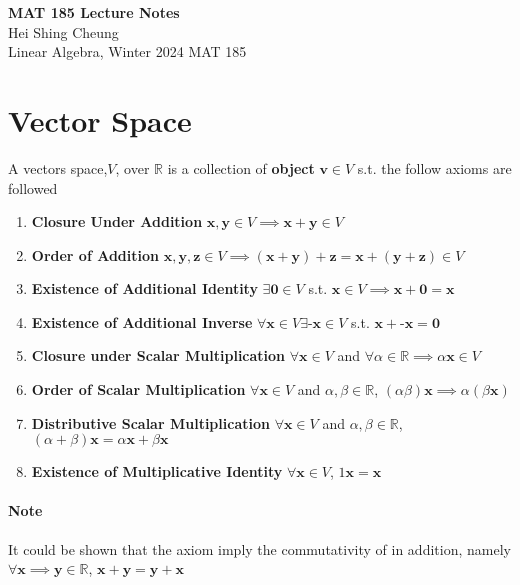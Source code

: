 \documentclass[11pt]{article}
\begin{document}
\thispagestyle{empty}
{\LARGE \bf MAT 185 Lecture Notes}\\
{\large Hei Shing Cheung}\\
Linear Algebra, Winter 2024 \hfill MAT 185\\
\section{Vector Space}
\begin{definition}
    A vectors space,${V}$, over $\mathbb{R}$ is a collection of \textbf{object} $\textbf{v} \in V$ s.t. the follow axioms are followed
    \begin{enumerate}
        \item \textbf{Closure Under Addition} $\textbf{x},\textbf{y} \in V \implies \textbf{x} + \textbf{y} \in V$
        \item \textbf{Order of Addition} $\textbf{x},\textbf{y}, \textbf{z} \in V \implies (\textbf{x} + \textbf{y}) + \textbf{z} = \textbf{x} + (\textbf{y} + \textbf{z}) \in V$
        \item \textbf{Existence of Additional Identity} $\exists \textbf{0} \in V$ s.t. $\textbf{x} \in V \implies \textbf{x} + \textbf{0} = \textbf{x}$
        \item \textbf{Existence of Additional Inverse} $\forall \textbf{x} \in V \exists \textbf{-x} \in V$ s.t. $\textbf{x} + \textbf{-x} = \textbf{0}$
        \item \textbf{Closure under Scalar Multiplication} $\forall \textbf{x} \in V$ and $\forall \alpha \in \mathbb{R} \implies \alpha\textbf{x} \in V$
        \item \textbf{Order of Scalar Multiplication} $\forall \textbf{x} \in V$ and $\alpha, \beta \in \mathbb{R}$, $(\alpha\beta)\textbf{x} \implies \alpha(\beta\textbf{x})$
        \item \textbf{Distributive Scalar Multiplication} $\forall \textbf{x} \in V$ and $\alpha, \beta \in \mathbb{R}$, $(\alpha + \beta)\textbf{x} = \alpha\textbf{x} + \beta\textbf{x}$
        \item \textbf{Existence of Multiplicative Identity} $\forall \textbf{x} \in V$, $1\textbf{x} = \textbf{x}$
    \end{enumerate}
\paragraph{Note} It could be shown that the axiom imply the commutativity of in addition, namely $\forall \textbf{x} \implies \textbf{y} \in \mathbb{R}$, $\textbf{x} + \textbf{y} = \textbf{y} + \textbf{x}$
\end{definition}
\end{document}
